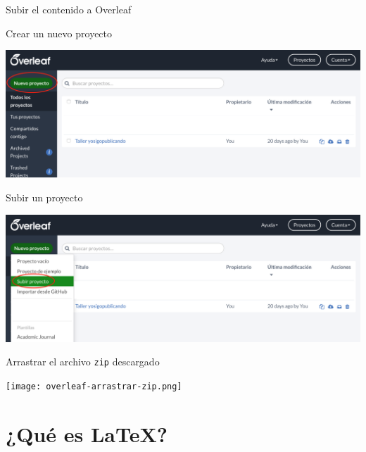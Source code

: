 \documentclass[10pt,xcolor=svgnames]{beamer}
\begin{document}
\begin{frame}{Subir el contenido a Overleaf}

  \begin{minipage}{0.25\linewidth}
    \small
    Crear un nuevo proyecto
  \end{minipage}
  \begin{minipage}{0.7\linewidth}
    \includegraphics[width=\linewidth]{overleaf-crear-proyecto.png}
  \end{minipage}

  \begin{minipage}{0.25\linewidth}
    \small
    Subir un proyecto
  \end{minipage}
  \begin{minipage}{0.7\linewidth}
    \includegraphics[width=\linewidth]{overleaf-subir-proyecto.png}
  \end{minipage}

  \begin{minipage}{0.25\linewidth}
    \small
    Arrastrar el archivo \texttt{zip} descargado
  \end{minipage}
  \begin{minipage}{0.7\linewidth}
    \texttt{[image: overleaf-arrastrar-zip.png]}
  \end{minipage}

\end{frame}



\section{¿Qué es \LaTeX?}
\end{document}
